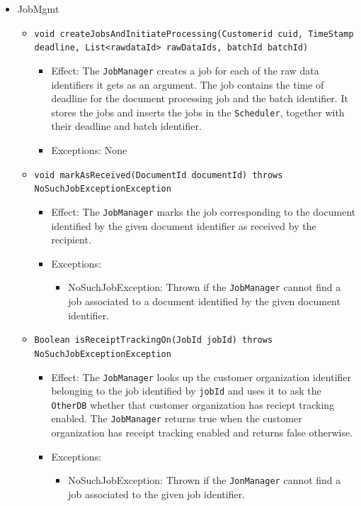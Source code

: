 \documentclass[a4paper,10pt]{article}
\begin{document}
\begin{itemize}
    \item JobMgmt
    \begin{itemize}
    	\item \texttt{void createJobsAndInitiateProcessing(Customerid cuid, TimeStamp deadline, List<rawdataId> rawDataIds, batchId batchId)}
    	\begin{itemize}
            \item Effect: The \texttt{JobManager} creates a job for each of the raw data identifiers it gets as an argument. The job contains the time of deadline for the document processing job and the batch identifier. It stores the jobs and inserts the jobs in the \texttt{Scheduler}, together with their deadline and batch identifier.
            \item Exceptions: None
        \end{itemize}
    	
    	\item \texttt{void markAsReceived(DocumentId documentId) throws NoSuchJobExceptionException}
    	\begin{itemize}
    		\item Effect: The \texttt{JobManager} marks the job corresponding to the document identified by the given document identifier as received by the recipient.
    		\item Exceptions:
    		\begin{itemize}
    			\item NoSuchJobException: Thrown if the \texttt{JobManager} cannot find a job associated to a document identified by the given document identifier.
    		\end{itemize}
    	\end{itemize}
    	
    	\item \texttt{Boolean isReceiptTrackingOn(JobId jobId) throws NoSuchJobExceptionException}
    	\begin{itemize}
    		\item Effect: The \texttt{JobManager} looks up the customer organization identifier belonging to the job identified by \texttt{jobId} and uses it to ask the \texttt{OtherDB} whether that customer organization has reciept tracking enabled. The \texttt{JobManager} returns true when the customer organization has receipt tracking enabled and returns false otherwise.
    		\item Exceptions:
    		\begin{itemize}
    			\item NoSuchJobException: Thrown if the \texttt{JonManager} cannot find a job associated to the given job identifier.
    		\end{itemize}
    	\end{itemize}   
    \end{itemize}     
\end{itemize}
\end{document}
